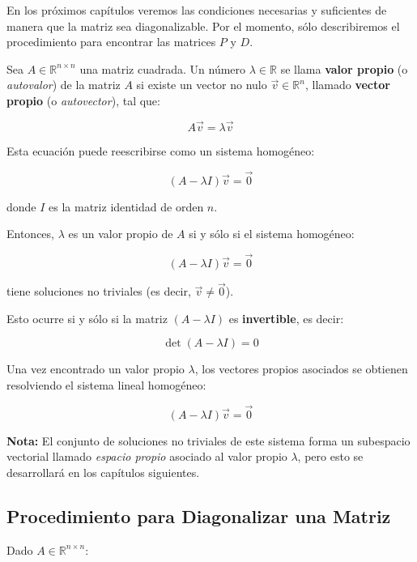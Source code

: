 En los próximos capítulos veremos las condiciones necesarias y suficientes de manera que la matriz sea diagonalizable. Por el momento, sólo describiremos el procedimiento para encontrar las matrices $P$ y $D$.
\begin{defin}
    Sea \( A \in \mathbb{R}^{n \times n} \) una matriz cuadrada. Un número \( \lambda \in \mathbb{R} \) se llama \textbf{valor propio} (o \textit{autovalor}) de la matriz \( A \) si existe un vector no nulo \( \vec{v} \in \mathbb{R}^n \), llamado \textbf{vector propio} (o \textit{autovector}), tal que:

\[
A\vec{v} = \lambda \vec{v}
\]

Esta ecuación puede reescribirse como un sistema homogéneo:

\[
(A - \lambda I)\vec{v} = \vec{0}
\]

donde \( I \) es la matriz identidad de orden \( n \). 

Entonces, \( \lambda \) es un valor propio de \( A \) si y sólo si el sistema homogéneo:

\[
(A - \lambda I)\vec{v} = \vec{0}
\]

tiene soluciones no triviales (es decir, \( \vec{v} \neq \vec{0} \)).

Esto ocurre si y sólo si la matriz \( (A - \lambda I) \) es \textbf{invertible}, es decir:

\[
\det(A - \lambda I) = 0
\]

Una vez encontrado un valor propio \( \lambda \), los vectores propios asociados se obtienen resolviendo el sistema lineal homogéneo:

\[
(A - \lambda I)\vec{v} = \vec{0}
\]

\textbf{Nota:} El conjunto de soluciones no triviales de este sistema forma un subespacio vectorial llamado \textit{espacio propio} asociado al valor propio \( \lambda \), pero esto se desarrollará en los capítulos siguientes.
\end{defin}



\subsection*{Procedimiento para Diagonalizar una Matriz}
Dado \( A \in \mathbb{R}^{n \times n} \):

